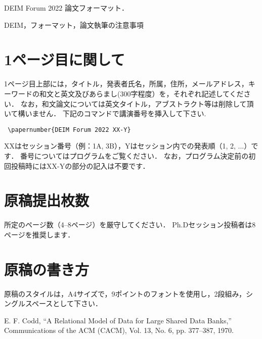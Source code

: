 \documentclass{deimj}
\begin{document}
\pagestyle{empty}
\begin{jabstract}
DEIM Forum 2022 論文フォーマット．
\end{jabstract}
\begin{jkeyword}
DEIM，フォーマット，論文執筆の注意事項
\end{jkeyword}
\maketitle

\section{1ページ目に関して}

1ページ目上部には，タイトル，発表者氏名，所属，住所，メールアドレス，キーワードの和文と英文及びあらまし(300字程度）を，それぞれ記述してください．
なお，和文論文については英文タイトル，アブストラクト等は削除して頂いて構いません．
下記のコマンドで講演番号を挿入して下さい.
\begin{verbatim}
 \papernumber{DEIM Forum 2022 XX-Y}
\end{verbatim}
XXはセッション番号（例：1A, 3B），Yはセッション内での発表順（1, 2, ...）です．
番号についてはプログラムをご覧ください．
なお，プログラム決定前の初回投稿時にはXX-Yの部分の記入は不要です．

\section{原稿提出枚数}

所定のページ数（4--8ページ）を厳守してください．
Ph.Dセッション投稿者は8ページを推奨します．

\section{原稿の書き方}

原稿のスタイルは，A4サイズで，9ポイントのフォントを使用し，2段組み，シングルスペースとして下さい．

\vspace{2em}

\begin{thebibliography}{99}
  E. F. Codd, 
  ``A Relational Model of Data for Large Shared Data Banks,''
  Communications of the {ACM} (CACM), Vol. 13, No. 6, pp. 377--387, 1970.
\end{thebibliography}
\end{document}
